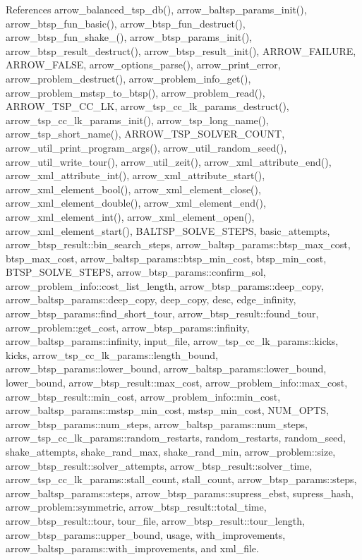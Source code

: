 References arrow\_\-balanced\_\-tsp\_\-db(), arrow\_\-baltsp\_\-params\_\-init(), arrow\_\-btsp\_\-fun\_\-basic(), arrow\_\-btsp\_\-fun\_\-destruct(), arrow\_\-btsp\_\-fun\_\-shake\_(), arrow\_\-btsp\_\-params\_\-init(), arrow\_\-btsp\_\-result\_\-destruct(), arrow\_\-btsp\_\-result\_\-init(), ARROW\_\-FAILURE, ARROW\_\-FALSE, arrow\_\-options\_\-parse(), arrow\_\-print\_\-error, arrow\_\-problem\_\-destruct(), arrow\_\-problem\_\-info\_\-get(), arrow\_\-problem\_\-mstsp\_\-to\_\-btsp(), arrow\_\-problem\_\-read(), ARROW\_\-TSP\_\-CC\_\-LK, arrow\_\-tsp\_\-cc\_\-lk\_\-params\_\-destruct(), arrow\_\-tsp\_\-cc\_\-lk\_\-params\_\-init(), arrow\_\-tsp\_\-long\_\-name(), arrow\_\-tsp\_\-short\_\-name(), ARROW\_\-TSP\_\-SOLVER\_\-COUNT, arrow\_\-util\_\-print\_\-program\_\-args(), arrow\_\-util\_\-random\_\-seed(), arrow\_\-util\_\-write\_\-tour(), arrow\_\-util\_\-zeit(), arrow\_\-xml\_\-attribute\_\-end(), arrow\_\-xml\_\-attribute\_\-int(), arrow\_\-xml\_\-attribute\_\-start(), arrow\_\-xml\_\-element\_\-bool(), arrow\_\-xml\_\-element\_\-close(), arrow\_\-xml\_\-element\_\-double(), arrow\_\-xml\_\-element\_\-end(), arrow\_\-xml\_\-element\_\-int(), arrow\_\-xml\_\-element\_\-open(), arrow\_\-xml\_\-element\_\-start(), BALTSP\_\-SOLVE\_\-STEPS, basic\_\-attempts, arrow\_\-btsp\_\-result::bin\_\-search\_\-steps, arrow\_\-baltsp\_\-params::btsp\_\-max\_\-cost, btsp\_\-max\_\-cost, arrow\_\-baltsp\_\-params::btsp\_\-min\_\-cost, btsp\_\-min\_\-cost, BTSP\_\-SOLVE\_\-STEPS, arrow\_\-btsp\_\-params::confirm\_\-sol, arrow\_\-problem\_\-info::cost\_\-list\_\-length, arrow\_\-btsp\_\-params::deep\_\-copy, arrow\_\-baltsp\_\-params::deep\_\-copy, deep\_\-copy, desc, edge\_\-infinity, arrow\_\-btsp\_\-params::find\_\-short\_\-tour, arrow\_\-btsp\_\-result::found\_\-tour, arrow\_\-problem::get\_\-cost, arrow\_\-btsp\_\-params::infinity, arrow\_\-baltsp\_\-params::infinity, input\_\-file, arrow\_\-tsp\_\-cc\_\-lk\_\-params::kicks, kicks, arrow\_\-tsp\_\-cc\_\-lk\_\-params::length\_\-bound, arrow\_\-btsp\_\-params::lower\_\-bound, arrow\_\-baltsp\_\-params::lower\_\-bound, lower\_\-bound, arrow\_\-btsp\_\-result::max\_\-cost, arrow\_\-problem\_\-info::max\_\-cost, arrow\_\-btsp\_\-result::min\_\-cost, arrow\_\-problem\_\-info::min\_\-cost, arrow\_\-baltsp\_\-params::mstsp\_\-min\_\-cost, mstsp\_\-min\_\-cost, NUM\_\-OPTS, arrow\_\-btsp\_\-params::num\_\-steps, arrow\_\-baltsp\_\-params::num\_\-steps, arrow\_\-tsp\_\-cc\_\-lk\_\-params::random\_\-restarts, random\_\-restarts, random\_\-seed, shake\_\-attempts, shake\_\-rand\_\-max, shake\_\-rand\_\-min, arrow\_\-problem::size, arrow\_\-btsp\_\-result::solver\_\-attempts, arrow\_\-btsp\_\-result::solver\_\-time, arrow\_\-tsp\_\-cc\_\-lk\_\-params::stall\_\-count, stall\_\-count, arrow\_\-btsp\_\-params::steps, arrow\_\-baltsp\_\-params::steps, arrow\_\-btsp\_\-params::supress\_\-ebst, supress\_\-hash, arrow\_\-problem::symmetric, arrow\_\-btsp\_\-result::total\_\-time, arrow\_\-btsp\_\-result::tour, tour\_\-file, arrow\_\-btsp\_\-result::tour\_\-length, arrow\_\-btsp\_\-params::upper\_\-bound, usage, with\_\-improvements, arrow\_\-baltsp\_\-params::with\_\-improvements, and xml\_\-file.

